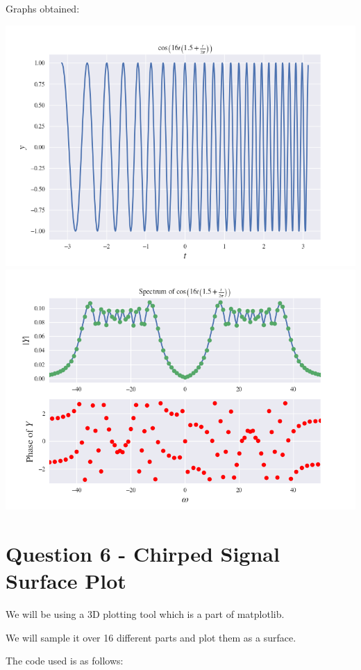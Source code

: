 \documentclass[12pt]{article}
\begin{document}
Graphs obtained:
\begin{center}
    \includegraphics[scale=0.7]{images/fig13.png}
    \includegraphics[scale=0.7]{images/fig12.png}
\end{center}

\pagebreak
\section{Question 6 - Chirped Signal Surface Plot}

We will be using a 3D plotting tool which is a part of matplotlib.

We will sample it over 16 different parts and plot them as a surface.

The code used is as follows:
\end{document}
